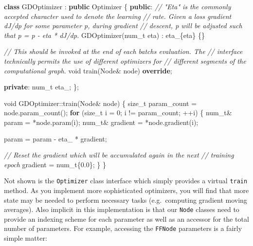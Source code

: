 \documentclass[
]{article}
\newenvironment{Shaded}{}{}
\newcommand{\CommentTok}[1]{\textcolor[rgb]{0.38,0.63,0.69}{\textit{#1}}}
\newcommand{\ControlFlowTok}[1]{\textcolor[rgb]{0.00,0.44,0.13}{\textbf{#1}}}
\newcommand{\DataTypeTok}[1]{\textcolor[rgb]{0.56,0.13,0.00}{#1}}
\newcommand{\DecValTok}[1]{\textcolor[rgb]{0.25,0.63,0.44}{#1}}
\newcommand{\FloatTok}[1]{\textcolor[rgb]{0.25,0.63,0.44}{#1}}
\newcommand{\KeywordTok}[1]{\textcolor[rgb]{0.00,0.44,0.13}{\textbf{#1}}}
\newcommand{\NormalTok}[1]{#1}
\newcommand{\VariableTok}[1]{\textcolor[rgb]{0.10,0.09,0.49}{#1}}
\begin{document}
\begin{Shaded}
\begin{Highlighting}[]
\KeywordTok{class}\NormalTok{ GDOptimizer : }\KeywordTok{public}\NormalTok{ Optimizer}
\NormalTok{\{}
\KeywordTok{public}\NormalTok{:}
    \CommentTok{// "Eta" is the commonly accepted character used to denote the learning}
    \CommentTok{// rate. Given a loss gradient dJ/dp for some parameter p, during gradient}
    \CommentTok{// descent, p will be adjusted such that p\textquotesingle{} = p {-} eta * dJ/dp.}
\NormalTok{    GDOptimizer(}\DataTypeTok{num\_t}\NormalTok{ eta) : }\VariableTok{eta\_}\NormalTok{\{eta\} \{\}}

    \CommentTok{// This should be invoked at the end of each batch\textquotesingle{}s evaluation. The}
    \CommentTok{// interface technically permits the use of different optimizers for}
    \CommentTok{// different segments of the computational graph.}
    \DataTypeTok{void}\NormalTok{ train(Node\& node) }\KeywordTok{override}\NormalTok{;}

\KeywordTok{private}\NormalTok{:}
    \DataTypeTok{num\_t} \VariableTok{eta\_}\NormalTok{;}
\NormalTok{\};}

\DataTypeTok{void}\NormalTok{ GDOptimizer::train(Node\& node)}
\NormalTok{\{}
    \DataTypeTok{size\_t}\NormalTok{ param\_count = node.param\_count();}
    \ControlFlowTok{for}\NormalTok{ (}\DataTypeTok{size\_t}\NormalTok{ i = }\DecValTok{0}\NormalTok{; i != param\_count; ++i)}
\NormalTok{    \{}
        \DataTypeTok{num\_t}\NormalTok{\& param    = *node.param(i);}
        \DataTypeTok{num\_t}\NormalTok{\& gradient = *node.gradient(i);}

\NormalTok{        param = param {-} }\VariableTok{eta\_}\NormalTok{ * gradient;}

        \CommentTok{// Reset the gradient which will be accumulated again in the next}
        \CommentTok{// training epoch}
\NormalTok{        gradient = }\DataTypeTok{num\_t}\NormalTok{\{}\FloatTok{0.0}\NormalTok{\};}
\NormalTok{    \}}
\NormalTok{\}}
\end{Highlighting}
\end{Shaded}

Not shown is the \texttt{Optimizer} class interface which simply
provides a virtual \texttt{train} method. As you implement more
sophisticated optimizers, you will find that more state may be needed to
perform necessary tasks (e.g.~computing gradient moving averages). Also
implicit in this implementation is that our \texttt{Node} classes need
to provide an indexing scheme for each parameter as well as an accessor
for the total number of parameters. For example, accessing the
\texttt{FFNode} parameters is a fairly simple matter:
\end{document}
